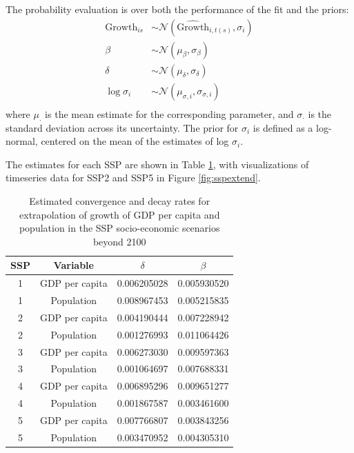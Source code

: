 \documentclass[12pt,english]{article}
\begin{document}
The probability evaluation is over both the performance of the fit and the priors:
\begin{align*}
  \text{Growth}_{is} &\sim \mathcal{N}\left(\widehat{\text{Growth}}_{i,t(s)}, \sigma_i\right)\\
\beta &\sim \mathcal{N}\left(\mu_\beta, \sigma_\beta\right) \\
\delta &\sim \mathcal{N}\left(\mu_\delta, \sigma_\delta\right) \\
\log{\sigma_i} &\sim \mathcal{N}\left(\mu_{\sigma,i}, \sigma_{\sigma,i}\right)\\
\end{align*}
where $\mu_\cdot$ is the mean estimate for the corresponding
parameter, and $\sigma_\cdot$ is the standard deviation across its
uncertainty. The prior for $\sigma_i$ is defined as a log-normal,
centered on the mean of the estimates of log $\sigma_i$.

The estimates for each SSP are shown in Table
\ref{tab:SSPs_after_2100}, with visualizations of timeseries data for SSP2 and SSP5 in Figure \ref{fig:sspextend}.

\begin{table}[h!]
    \caption{Estimated convergence and decay rates for extrapolation of growth of GDP per capita and population in the SSP socio-economic scenarios beyond 2100}
    \label{tab:SSPs_after_2100}
    \centering
   \begin{tabular}{cccc}
\toprule
SSP & Variable & $\delta$ & $\beta$ \\
\midrule
1 &   GDP per capita & 0.006205028 & 0.005930520 \\
1 &     Population & 0.008967453 & 0.005215835 \\
2 &   GDP per capita & 0.004190444 & 0.007228942 \\
2 &     Population & 0.001276993 & 0.011064426 \\
3 &   GDP per capita & 0.006273030 & 0.009597363 \\
3 &     Population & 0.001064697 & 0.007688331 \\
4 &   GDP per capita & 0.006895296 & 0.009651277 \\
4 &     Population & 0.001867587 & 0.003461600 \\
5 &   GDP per capita & 0.007766807 & 0.003843256 \\
5 &     Population & 0.003470952 & 0.004305310 \\
\bottomrule
\end{tabular}
\end{table}
\end{document}
